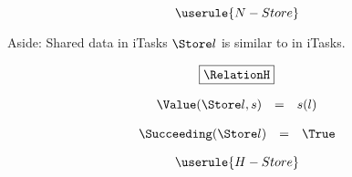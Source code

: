 \begin{equation*}
  \userule{N-Store}
\end{equation*}

\begin{margintext}{Aside: Shared data in iTasks}
  $\Store l$ is similar to  in iTasks.
\end{margintext}

\begin{equation*}
  \boxed{\RelationH}
\end{equation*}

\begin{equation*}
  \begin{array}{lcl}
    \Value(\Store l, s) &=& s(l)
  \end{array}
\end{equation*}

\begin{equation*}
  \begin{array}{lcl}
    \Succeeding(\Store l) &=& \True
  \end{array}
\end{equation*}

\begin{equation*}
  \userule{H-Store}
\end{equation*}
